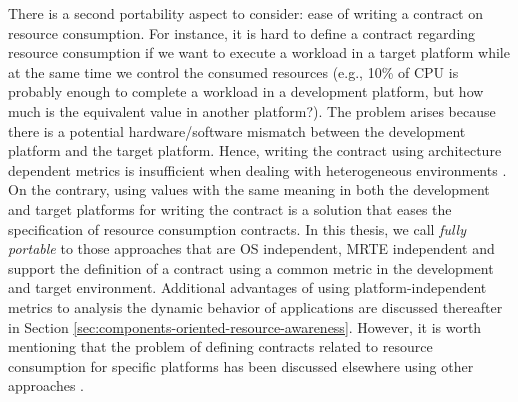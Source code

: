 \begin{itemize}
There is a second portability aspect to consider: ease of writing a contract on resource consumption.
For instance, it is hard to define a contract regarding resource consumption if we want to execute a workload in a target platform while at the same time we control the consumed resources (e.g., 10\% of CPU is probably enough to complete a workload in a development platform, but how much is the equivalent value in another platform?).
The problem arises because there is a potential hardware/software mismatch between the development platform and the target platform.
Hence, writing the contract using architecture dependent metrics is insufficient when dealing with heterogeneous environments \cite{Daly2001, Dufour:2003:DMJ:949343.949320}.
On the contrary, using values with the same meaning in both the development and target platforms for writing the contract is a solution that eases the specification of resource consumption contracts.
In this thesis, we call \textit{fully portable} to those approaches that are OS independent, MRTE independent and support the definition of a contract using a common metric in the development and target environment.
Additional advantages of using platform-independent metrics to analysis the dynamic behavior of applications are discussed thereafter in Section \ref{sec:components-oriented-resource-awareness}.
However, it is worth mentioning that the problem of defining contracts related to resource consumption for specific platforms has been discussed elsewhere using other approaches \cite{Lambert200897, Pathak:2012:ESI:2168836.2168841}.




\end{itemize}

